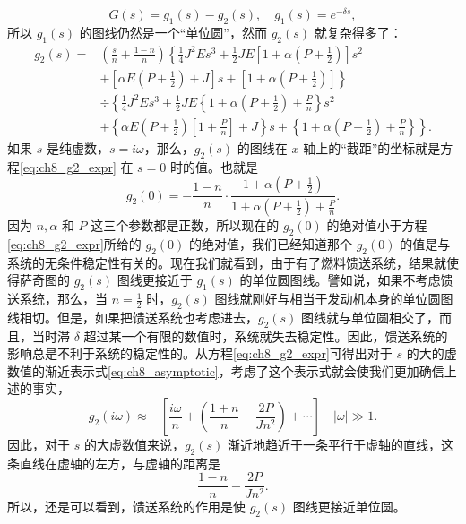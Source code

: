 \begin{equation*}
G(s) = g_1(s) - g_2(s), \quad g_1(s) = e^{-\delta s},
\end{equation*}
所以 $ g_1(s) $ 的图线仍然是一个“单位圆”，然而 $ g_2(s) $ 就复杂得多了：
\begin{equation}\label{eq:ch8_g2_expr}
\begin{aligned}
g_2(s) = &\left( \frac{s}{n} + \frac{1-n}{n} \right) \left\{ \frac{1}{4} J^2 E s^3 + \frac{1}{2} J E \left[ 1 + \alpha \left( P + \frac{1}{2} \right) \right] s^2 \right. \\
&+ \left. \left[ \alpha E \left( P + \frac{1}{2} \right) + J \right] s + \left[ 1 + \alpha \left( P + \frac{1}{2} \right) \right] \right\} \\
&\div \left\{ \frac{1}{4} J^2 E s^3 + \frac{1}{2} J E \left\{ 1 + \alpha \left( P + \frac{1}{2} \right) + \frac{P}{n} \right\} s^2 \right. \\
&+ \left. \left\{ \alpha E \left( P + \frac{1}{2} \right) \left[ 1 + \frac{P}{n} \right] + J \right\} s + \left\{ 1 + \alpha \left( P + \frac{1}{2} \right) + \frac{P}{n} \right\} \right\}.
\end{aligned}
\end{equation}
如果 $ s $ 是纯虚数，$ s = i\omega $，那么，$ g_2(s) $ 的图线在 $ x $ 轴上的“截距”的坐标就是方程\eqref{eq:ch8_g2_expr} 在 $ s=0 $ 时的值。也就是
\begin{equation}\label{eq:ch8_g2_zero}
g_2(0) = -\frac{1 - n}{n} \cdot \frac{1 + \alpha\left(P + \frac{1}{2}\right)}{1 + \alpha\left(P + \frac{1}{2}\right) + \frac{P}{n}}.
\end{equation}
因为 $ n, \alpha $ 和 $ P $ 这三个参数都是正数，所以现在的 $ g_2(0) $ 的绝对值小于方程\eqref{eq:ch8_g2_expr}所给的 $ g_2(0) $ 的绝对值，我们已经知道那个 $ g_2(0) $ 的值是与系统的无条件稳定性有关的。现在我们就看到，由于有了燃料馈送系统，结果就使得萨奇图的 $ g_2(s) $ 图线更接近于 $ g_1(s) $ 的单位圆图线。譬如说，如果不考虑馈送系统，那么，当 $ n = \frac{1}{2} $ 时，$ g_2(s) $ 图线就刚好与相当于发动机本身的单位圆图线相切。但是，如果把馈送系统也考虑进去，$ g_2(s) $ 图线就与单位圆相交了，而且，当时滞 $ \delta $ 超过某一个有限的数值时，系统就失去稳定性。因此，馈送系统的影响总是不利于系统的稳定性的。从方程\eqref{eq:ch8_g2_expr}可得出对于 $ s $ 的大的虚数值的渐近表示式\eqref{eq:ch8_asymptotic}，考虑了这个表示式就会使我们更加确信上述的事实，
\begin{equation}\label{eq:ch8_asymptotic}
g_2(i\omega) \approx -\left[\frac{i\omega}{n} + \left(\frac{1 + n}{n} - \frac{2P}{Jn^2}\right) + \cdots\right] \quad |\omega| \gg 1.
\end{equation}
因此，对于 $ s $ 的大虚数值来说，$ g_2(s) $ 渐近地趋近于一条平行于虚轴的直线，这条直线在虚轴的左方，与虚轴的距离是
\begin{equation*}
\frac{1 - n}{n} - \frac{2P}{Jn^2}.
\end{equation*}
所以，还是可以看到，馈送系统的作用是使 $ g_2(s) $ 图线更接近单位圆。

